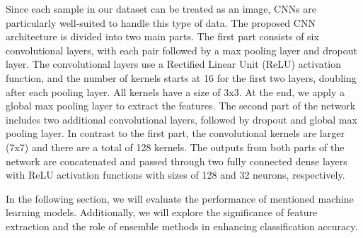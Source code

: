 \documentclass{ieeeaccess}
\begin{document}
Since each sample in our dataset can be treated as an image, CNNs are particularly well-suited to handle this type of data. The proposed CNN architecture is divided into two main parts. The first part consists of six convolutional layers, with each pair followed by a max pooling layer and dropout layer. The convolutional layers use a Rectified Linear Unit (ReLU) activation function, and the number of kernels starts at 16 for the first two layers, doubling after each pooling layer. All kernels have a size of 3x3. At the end, we apply a global max pooling layer to extract the features. The second part of the network includes two additional convolutional layers, followed by dropout and global max pooling layer. In contrast to the first part, the convolutional kernels are larger (7x7) and there are a total of 128 kernels. The outputs from both parts of the network are concatenated and passed through two fully connected dense layers with ReLU activation functions with sizes of 128 and 32 neurons, respectively. 

In the following section, we will evaluate the performance of mentioned machine learning models. Additionally, we will explore the significance of feature extraction and the role of ensemble methods in enhancing classification accuracy.
\end{document}
